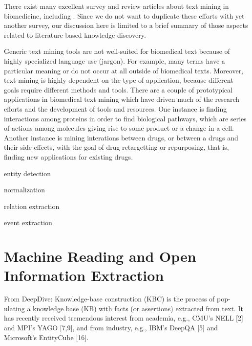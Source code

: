 There exist many excellent survey and review articles about text mining in biomedicine, including
\citep{Neves2012Survey,Simpson2012Biomedical,Andronis2011Literature,Ananiadou2010Event,RodriguezEsteban2009Biomedical,Zweigenbaum2009Advanced,Cohen2008Getting,Zweigenbaum2007Frontiers,Ananiadou2006,Erhardt2006Status,JenEA06,Spasic2005Text,Cohen2005Survey,Krauthammer2004Term,Blake2011Text}.
Since we do not want to duplicate these efforts with yet another survey, our discussion here is limited to a brief summary of those aspects related to literature-based knowledge discovery.  

Generic text mining tools are not well-suited for biomedical text because of highly specialized language use (jargon). 
For example, many terms have a particular meaning or do not occur at all outside of biomedical texts.
Moreover, text mining is highly dependent on the type of application, because different goals require different methods and tools.
There are a couple of prototypical applications in biomedical text mining which have driven much of the research efforts and the development of tools and resources.
One instance is finding interactions among proteins in order to find biological pathways, which are series of actions among molecules giving rise to some product or a change in a cell.
Another instance is mining interations between drugs, or between a drugs and their side effects, with the goal of drug retargetting or repurposing, that is, finding new applications for existing drugs.

entity detection

normalization

relation extraction

event extraction


\section{Machine Reading and Open Information Extraction}


\citet{Etzioni2011Search}

From DeepDive:
Knowledge-base construction (KBC) is the process of pop-
ulating a knowledge base (KB) with facts (or assertions)
extracted from text. It has recently received tremendous
interest from academia, e.g., CMU's NELL [2] and MPI's
YAGO [7,9], and from industry, e.g., IBM's DeepQA [5] and
Microsoft's EntityCube [16]. 




